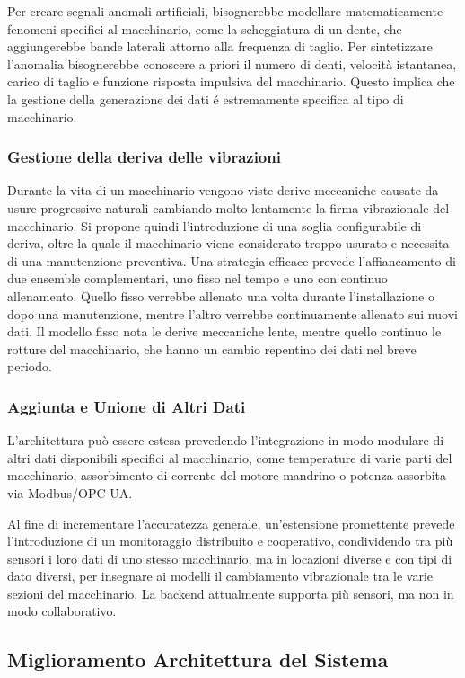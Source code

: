 Per creare segnali anomali artificiali, bisognerebbe modellare matematicamente fenomeni specifici al macchinario, come la scheggiatura di un dente, che aggiungerebbe bande laterali attorno alla frequenza di taglio. Per sintetizzare l'anomalia bisognerebbe conoscere a priori il numero di denti, velocità istantanea, carico di taglio e funzione risposta impulsiva del macchinario. Questo implica che la gestione della generazione dei dati é estremamente specifica al tipo di macchinario.

\subsubsection{Gestione della deriva delle vibrazioni}
Durante la vita di un macchinario vengono viste derive meccaniche causate da usure progressive naturali cambiando molto lentamente la firma vibrazionale del macchinario.
Si propone quindi l'introduzione di una soglia configurabile di deriva, oltre la quale il macchinario viene considerato troppo usurato e necessita di una manutenzione preventiva.
Una strategia efficace prevede l'affiancamento di due ensemble complementari, uno fisso nel tempo e uno con continuo allenamento. Quello fisso verrebbe allenato una volta durante l'installazione o dopo una manutenzione, mentre l'altro verrebbe continuamente allenato sui nuovi dati. Il modello fisso nota le derive meccaniche lente, mentre quello continuo le rotture del macchinario, che hanno un cambio repentino dei dati nel breve periodo.

\subsubsection{Aggiunta e Unione di Altri Dati}
L'architettura può essere estesa prevedendo l'integrazione in modo modulare di altri dati disponibili specifici al macchinario, come temperature di varie parti del macchinario, assorbimento di corrente del motore mandrino o potenza assorbita via Modbus/OPC-UA.

Al fine di incrementare l'accuratezza generale, un'estensione promettente prevede l'introduzione di un monitoraggio distribuito e cooperativo, condividendo tra più sensori i loro dati di uno stesso macchinario, ma in locazioni diverse e con tipi di dato diversi, per insegnare ai modelli il cambiamento vibrazionale tra le varie sezioni del macchinario. La backend attualmente supporta più sensori, ma non in modo collaborativo.

\subsection{Miglioramento Architettura del Sistema}
